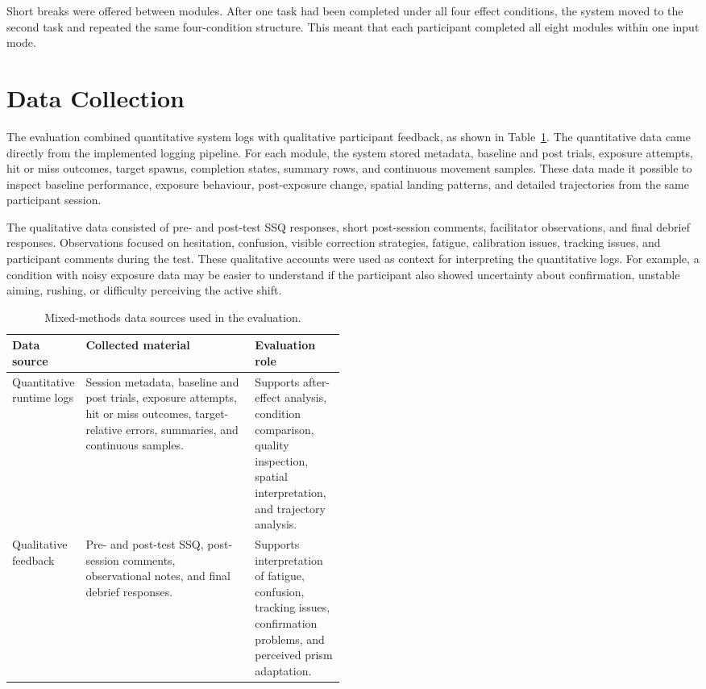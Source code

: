 Short breaks were offered between modules. After one task had been completed under all four effect conditions, the system moved to the second task and repeated the same four-condition structure. This meant that each participant completed all eight modules within one input mode.

\section{Data Collection}
\label{sec:evaluation-data}

The evaluation combined quantitative system logs with qualitative participant feedback, as shown in Table~\ref{tab:evaluation-data-sources}. The quantitative data came directly from the implemented logging pipeline. For each module, the system stored metadata, baseline and post trials, exposure attempts, hit or miss outcomes, target spawns, completion states, summary rows, and continuous movement samples. These data made it possible to inspect baseline performance, exposure behaviour, post-exposure change, spatial landing patterns, and detailed trajectories from the same participant session.

The qualitative data consisted of pre- and post-test SSQ responses, short post-session comments, facilitator observations, and final debrief responses. Observations focused on hesitation, confusion, visible correction strategies, fatigue, calibration issues, tracking issues, and participant comments during the test. These qualitative accounts were used as context for interpreting the quantitative logs. For example, a condition with noisy exposure data may be easier to understand if the participant also showed uncertainty about confirmation, unstable aiming, rushing, or difficulty perceiving the active shift.

\begin{table}[H]
    \centering
    \footnotesize
    \setlength{\tabcolsep}{6pt}
    \renewcommand{\arraystretch}{1.18}
    \begin{tabularx}{\linewidth}{|
        >{\raggedright\arraybackslash}p{0.21\linewidth}|
        >{\raggedright\arraybackslash}X|
        >{\raggedright\arraybackslash}p{0.27\linewidth}|}
        \hline
        \textbf{Data source} & \textbf{Collected material} & \textbf{Evaluation role} \\
        \hline
        Quantitative runtime logs & Session metadata, baseline and post trials, exposure attempts, hit or miss outcomes, target-relative errors, summaries, and continuous samples. & Supports after-effect analysis, condition comparison, quality inspection, spatial interpretation, and trajectory analysis. \\
        \hline
        Qualitative feedback & Pre- and post-test SSQ, post-session comments, observational notes, and final debrief responses. & Supports interpretation of fatigue, confusion, tracking issues, confirmation problems, and perceived prism adaptation. \\
        \hline
    \end{tabularx}
    \caption{Mixed-methods data sources used in the evaluation.}
    \label{tab:evaluation-data-sources}
\end{table}

